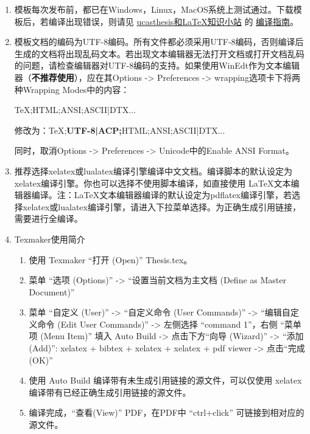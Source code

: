 \begin{enumerate}
    \item 模板每次发布前，都已在Windows，Linux，MacOS系统上测试通过。下载模板后，若编译出现错误，则请见 \href{https://github.com/mohuangrui/ucasthesis/wiki}{ucasthesis和\LaTeX{}知识小站} 的 \href{https://github.com/mohuangrui/ucasthesis/wiki/%E7%BC%96%E8%AF%91%E6%8C%87%E5%8D%97}{编译指南}。

    \item 模板文档的编码为UTF-8编码。所有文件都必须采用UTF-8编码，否则编译后生成的文档将出现乱码文本。若出现文本编辑器无法打开文档或打开文档乱码的问题，请检查编辑器对UTF-8编码的支持。如果使用WinEdt作为文本编辑器（\textbf{不推荐使用}），应在其Options -> Preferences -> wrapping选项卡下将两种Wrapping Modes中的内容：

        TeX;HTML;ANSI;ASCII|DTX...

        修改为：TeX;\textbf{UTF-8|ACP;}HTML;ANSI;ASCII|DTX...

        同时，取消Options -> Preferences -> Unicode中的Enable ANSI Format。

    \item 推荐选择xelatex或lualatex编译引擎编译中文文档。编译脚本的默认设定为xelatex编译引擎。你也可以选择不使用脚本编译，如直接使用 \LaTeX{}文本编辑器编译。注：\LaTeX{}文本编辑器编译的默认设定为pdflatex编译引擎，若选择xelatex或lualatex编译引擎，请进入下拉菜单选择。为正确生成引用链接，需要进行全编译。

    \item Texmaker使用简介
        \begin{enumerate}
            \footnotesize
            \item 使用 Texmaker “打开 (Open)” Thesis.tex。
            \item 菜单 “选项 (Options)” -> “设置当前文档为主文档 (Define as Master Document)”
            \item 菜单 “自定义 (User)” -> “自定义命令 (User Commands)” -> “编辑自定义命令 (Edit User Commands)” -> 左侧选择 “command 1”，右侧 “菜单项 (Menu Item)” 填入 Auto Build -> 点击下方“向导 (Wizard)” -> “添加 (Add)”: xelatex + bibtex + xelatex + xelatex + pdf viewer -> 点击“完成 (OK)”
            \item 使用 Auto Build 编译带有未生成引用链接的源文件，可以仅使用 xelatex 编译带有已经正确生成引用链接的源文件。
            \item 编译完成，“查看(View)” PDF，在PDF中 “ctrl+click” 可链接到相对应的源文件。
        \end{enumerate}


\end{enumerate}
